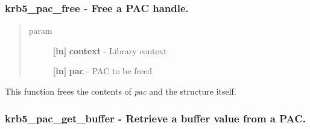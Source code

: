 \documentclass[letterpaper,10pt,english]{sphinxmanual}
\begin{document}
\subsubsection{krb5\_pac\_free -  Free a PAC handle.}
\label{appdev/refs/api/krb5_pac_free:krb5-pac-free-free-a-pac-handle}\label{appdev/refs/api/krb5_pac_free::doc}

\begin{fulllineitems}
\label{appdev/refs/api/krb5_pac_free:krb5_pac_free}
\end{fulllineitems}

\begin{quote}\begin{description}
\item[{param}] \leavevmode
\textbf{{[}in{]}} \textbf{context} - Library context

\textbf{{[}in{]}} \textbf{pac} - PAC to be freed

\end{description}\end{quote}

This function frees the contents of \emph{pac} and the structure itself.


\subsubsection{krb5\_pac\_get\_buffer -  Retrieve a buffer value from a PAC.}
\label{appdev/refs/api/krb5_pac_get_buffer::doc}\label{appdev/refs/api/krb5_pac_get_buffer:krb5-pac-get-buffer-retrieve-a-buffer-value-from-a-pac}

\begin{fulllineitems}
\label{appdev/refs/api/krb5_pac_get_buffer:krb5_pac_get_buffer}
\end{fulllineitems}
\end{document}
